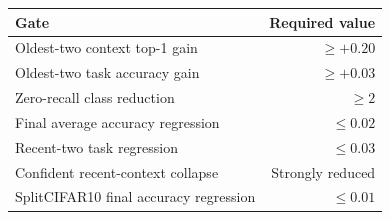 \begin{tabular}{@{}lr@{}}
\toprule
Gate & Required value \\
\midrule
Oldest-two context top-1 gain & $\geq +0.20$ \\
Oldest-two task accuracy gain & $\geq +0.03$ \\
Zero-recall class reduction & $\geq 2$ \\
Final average accuracy regression & $\leq 0.02$ \\
Recent-two task regression & $\leq 0.03$ \\
Confident recent-context collapse & Strongly reduced \\
SplitCIFAR10 final accuracy regression & $\leq 0.01$ \\
\bottomrule
\end{tabular}
